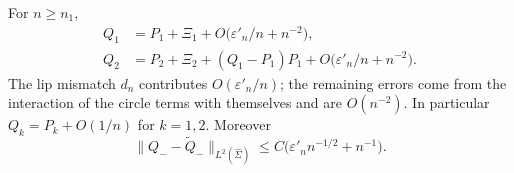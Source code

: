 \begin{proposition}\label{prop:moments}
For $n\ge n_1$,
\begin{align*}
  Q_1&=P_1+\Xi_1+O\bigl(\varepsilon'_n/n+n^{-2}\bigr),\\
  Q_2&=P_2+\Xi_2+(Q_1-P_1)P_1+O\bigl(\varepsilon'_n/n+n^{-2}\bigr).
\end{align*}
The lip mismatch $d_n$ contributes $O(\varepsilon'_n/n)$; the remaining errors come from the interaction of the circle
terms with themselves and are $O(n^{-2})$. In particular $Q_k=P_k+O(1/n)$ for $k=1,2$. Moreover
\begin{equation}\label{eq:he-L2-diff}
  \|Q_--\tilde Q_-\|_{L^2(\hat\Sigma)}\le C\bigl(\varepsilon'_nn^{-1/2}+n^{-1}\bigr).
\end{equation}
\end{proposition}

